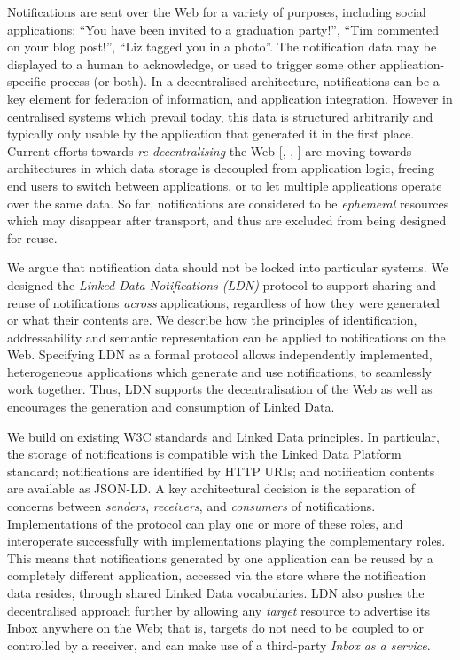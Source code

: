                         
							
\par Notifications are sent over the Web for a variety of purposes, including social applications: ``You have been invited to a graduation party!'', ``Tim commented on your blog post!'', ``Liz tagged you in a photo''. The notification data may be displayed to a human to acknowledge, or used to trigger some other application-specific process (or both). In a decentralised architecture, notifications can be a key element for federation of information, and application integration. However in centralised systems which prevail today, this data is structured arbitrarily and typically only usable by the application that generated it in the first place. Current efforts towards {\em re-decentralising} the Web [, , ] are moving towards architectures in which data storage is decoupled from application logic, freeing end users to switch between applications, or to let multiple applications operate over the same data. So far, notifications are considered to be {\em ephemeral} resources which may disappear after transport, and thus are excluded from being designed for reuse.

                            
\par We argue that notification data should not be locked into particular systems. We designed the {\em Linked Data Notifications (LDN)} protocol to support sharing and reuse of notifications {\em across} applications, regardless of how they were generated or what their contents are. We describe how the principles of identification, addressability and semantic representation can be applied to notifications on the Web. Specifying LDN as a formal protocol allows independently implemented, heterogeneous applications which generate and use notifications, to seamlessly work together. Thus, LDN supports the decentralisation of the Web as well as encourages the generation and consumption of Linked Data.

                            
\par We build on existing W3C standards and Linked Data principles. In particular, the storage of notifications is compatible with the Linked Data Platform standard; notifications are identified by HTTP URIs; and notification contents are available as JSON-LD. A key architectural decision is the separation of concerns between {\em senders}, {\em receivers}, and {\em consumers} of notifications. Implementations of the protocol can play one or more of these roles, and interoperate successfully with implementations playing the complementary roles. This means that notifications generated by one application can be reused by a completely different application, accessed via the store where the notification data resides, through shared Linked Data vocabularies. LDN also pushes the decentralised approach further by allowing any {\em target} resource to advertise its Inbox anywhere on the Web; that is, targets do not need to be coupled to or controlled by a receiver, and can make use of a third-party {\em Inbox as a service}.

